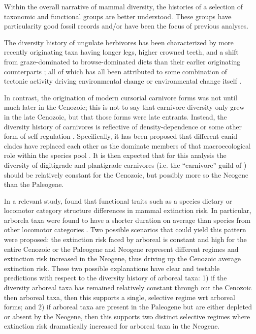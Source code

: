 \documentclass[12pt,letterpaper]{article}
\begin{document}
Within the overall narrative of mammal diversity, the histories of a selection of taxonomic and functional groups are better understood. These groups have particularity good fossil records and/or have been the focus of previous analyses.

The diversity history of ungulate herbivores has been characterized by more recently originating taxa having longer legs, higher crowned teeth, and a shift from graze-dominated to browse-dominated diets than their earlier originating counterparts \citep{Janis2004,Janis2000,Janis1993c,Janis2008a,Cantalapiedra2017,Fraser2015a}; all of which has all been attributed to some combination of tectonic activity driving environmental change or environmental change itself \citep{Janis2008a,Eronen2015,Blois2009,Badgley2017}. 

In contrast, the origination of modern cursorial carnivore forms was not until much later in the Cenozoic; this is not to say that carnivore diversity only grew in the late Cenozoic, but that those forms were late entrants. Instead, the diversity history of carnivores is reflective of density-dependence or some other form of self-regulation \citep{Valkenburgh1999,Silvestro2015b,Slater2015b}. Specifically, it has been proposed that different canid clades have replaced each other as the dominate members of that macroecological role within the species pool \citep{Silvestro2015b,Valkenburgh1999}. It is then expected that for this analysis the diversity of digitigrade and plantigrade carnivores (i.e. the ``carnivore'' guild of \citet{Valkenburgh1999}) should be relatively constant for the Cenozoic, but possibly more so the Neogene than the Paleogene.

In a relevant study, \citet{Smits2015b} found that functional traits such as a species dietary or locomotor category structure differences in mammal extinction risk. In particular, arborela taxa were found to have a shorter duration on average than species from other locomotor categories \citep{Smits2015b}. Two possible scenarios that could yield this pattern were proposed: the extinction risk faced by arboreal is constant and high for the entire Cenozoic or the Paleogene and Neogene represent different regimes and extinction risk increased in the Neogene, thus driving up the Cenozoic average extinction risk. These two possible explanations have clear and testable predictions with respect to the diversity history of arboreal taxa: 1) if the diversity arboreal taxa has remained relatively constant through out the Cenozoic then arboreal taxa, then this supports a single, selective regime wrt arboreal forms; and 2) if arboreal taxa are present in the Paleogene but are either depleted or absent by the Neogene, then this supports two distinct selective regimes where extinction risk dramatically increased for arboreal taxa in the Neogene.
\end{document}
